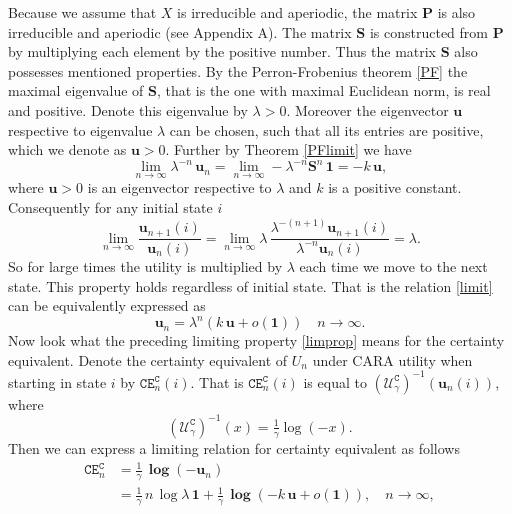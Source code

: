 Because we assume that $X$ is irreducible and aperiodic, the matrix $\bm{P}$ is also irreducible and aperiodic (see Appendix A). The matrix $\bm{S}$ is constructed from $\bm{P}$ by multiplying each element by the positive number. Thus the matrix $\bm{S}$ also possesses mentioned properties. By the Perron-Frobenius theorem \ref{PF} the maximal eigenvalue of $\bm{S}$, that is the one with maximal Euclidean norm, is real and positive. Denote this eigenvalue by $\lambda>0$. Moreover the eigenvector $\bm{u}$ respective to eigenvalue $\lambda$ can be chosen, such that all its entries are positive, which we denote as $\bm{u}>0$. Further by Theorem \ref{PFlimit} we have
\begin{equation}
\label{limit}
\lim_{n\rightarrow\infty}\lambda^{-n}\,\bm{u}_{n}=\lim_{n\rightarrow\infty}-\lambda^{-n} \bm{S}^{n}\,\bm{1}=-k\,\bm{u},
\end{equation}
where $\bm{u}>0$ is an eigenvector respective to $\lambda$ and $k$ is a positive constant. Consequently for any initial state $i$
$$\lim_{n\rightarrow\infty}\frac{\bm{u}_{n+1}(i)}{\bm{u}_{n}(i)}=\lim_{n\rightarrow\infty}\lambda\,\frac{\lambda^{-(n+1)}\bm{u}_{n+1}(i)}{\lambda^{-n}\bm{u}_{n}(i)}=\lambda.$$
So for large times the utility is multiplied by $\lambda$ each time we move to the next state. This property holds regardless of initial state. That is the relation \eqref{limit} can be equivalently expressed as
\begin{equation}
\label{limprop}
\bm{u}_n=\lambda^n(k\,\bm{u}+o(\bm{1})) \quad n\rightarrow \infty.
\end{equation}
Now look what the preceding limiting property \eqref{limprop} means for the certainty equivalent. Denote the certainty equivalent of $U_n$ under CARA utility when starting in state $i$ by $\bm{\texttt{CE}}^{\texttt{C}}_{n}(i)$. That is  $\bm{\texttt{CE}}^{\texttt{C}}_n(i)$ is equal to $(\mathcal{U}_{\gamma}^{\texttt{C}})^{-1}(\bm{u}_n(i))$, where \[(\mathcal{U}_{\gamma}^{\texttt{C}})^{-1}(x)=\tfrac{1}{\gamma}\log(-x).\] 
Then we can express a limiting relation for certainty equivalent as follows
\begin{equation}
\label{cn}
\begin{split}
\bm{\texttt{CE}}^{\texttt{C}}_n&= \tfrac{1}{\gamma}\,\bm{\log}(-\bm{u}_n)\\
&= \tfrac{1}{\gamma}\,n\,\log\lambda\,\bm{1} +\tfrac{1}{\gamma}\,\bm{\log}(-k\,\bm{u}+o(\bm{1})), \quad n\rightarrow \infty,
\end{split}
\end{equation}
